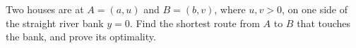 Two houses are at $A=(a,u)$ and $B=(b,v)$, where $u,v>0$, on one side of the straight river bank $y=0$. Find the shortest route from $A$ to $B$ that touches the bank, and prove its optimality.

